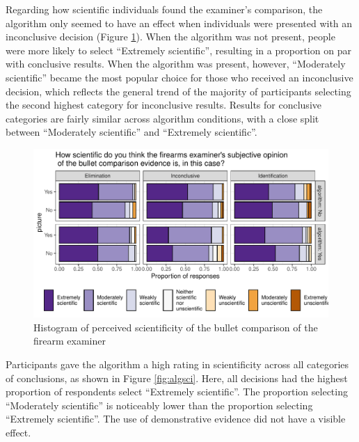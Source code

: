 \documentclass[print]{nuthesis}
\begin{document}
Regarding how scientific individuals found the examiner's comparison, the algorithm only seemed to have an effect when individuals were presented with an inconclusive decision (Figure \ref{fig:examsci}).
When the algorithm was not present, people were more likely to select ``Extremely scientific'', resulting in a proportion on par with conclusive results.
When the algorithm was present, however, ``Moderately scientific'' became the most popular choice for those who received an inconclusive decision, which reflects the general trend of the majority of participants selecting the second highest category for inconclusive results.
Results for conclusive categories are fairly similar across algorithm conditions, with a close split between ``Moderately scientific'' and ``Extremely scientific''.

\begin{figure}

{\centering \includegraphics[width=\linewidth]{thesis_files/figure-latex/examsci-1} 

}

\caption{Histogram of perceived scientificity of the bullet comparison of the firearm examiner}\label{fig:examsci}
\end{figure}

Participants gave the algorithm a high rating in scientificity across all categories of conclusions, as shown in Figure \ref{fig:algsci}.
Here, all decisions had the highest proportion of respondents select ``Extremely scientific''.
The proportion selecting ``Moderately scientific'' is noticeably lower than the proportion selecting ``Extremely scientific''.
The use of demonstrative evidence did not have a visible effect.
\end{document}
